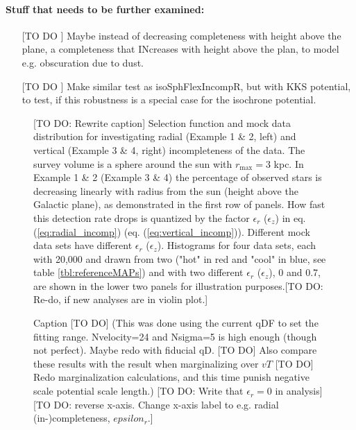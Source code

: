 \paragraph{Stuff that needs to be further examined:}
\begin{itemize}
\item[[TO DO]] Maybe instead of decreasing completeness with height above the plane, a completeness
that INcreases with height above the plan, to model e.g. obscuration due to dust.
\item[[TO DO]] Make similar test as isoSphFlexIncompR, but with KKS potential, to test, if this
robustness is a special case for the isochrone potential.
\end{itemize}


\begin{figure}
\caption{[TO DO: Rewrite caption] Selection function and mock data distribution for investigating radial (Example 1 \& 2, left) and vertical (Example 3 \& 4, right) incompleteness of the data. The survey volume is a sphere around the sun with $r_\text{max} = 3$ kpc. In Example 1 \& 2 (Example 3 \& 4) the percentage of observed stars is decreasing linearly with radius from the sun (height above the Galactic plane), as demonstrated in the first row of panels. How fast this detection rate drops is quantized by the factor $\epsilon_r$ ($\epsilon_z$) in eq. (\ref{eq:radial_incomp}) (eq. (\ref{eq:vertical_incomp})). Different mock data sets have different $\epsilon_r$ ($\epsilon_z$). Histograms for four data sets, each with 20,000 and drawn from two \MAPs ("hot" in red and "cool" in blue, see table \ref{tbl:referenceMAPs}) and with two different $\epsilon_r$ ($\epsilon_z$), 0 and 0.7, are shown in the lower two panels for illustration purposes.[TO DO: Re-do, if new analyses are in violin plot.]} 
\label{fig:incomp_mockdata}
\end{figure}


\begin{figure}
\caption{Caption [TO DO] (This was done using the current qDF to set the fitting range. Nvelocity=24 and Nsigma=5 is high enough (though not perfect). Maybe redo with fiducial qD. [TO DO] Also compare these results with the result when marginalizing over $vT$ [TO DO] Redo marginalization calculations, and this time punish negative scale potential scale length.) [TO DO: Write that $\epsilon_r = 0$ in analysis] [TO DO: reverse x-axis. Change x-axis label to e.g. radial (in-)completeness, $epsilon_r$.]} 
\label{fig:isoSphFlexIncompR_violins}
\end{figure}

